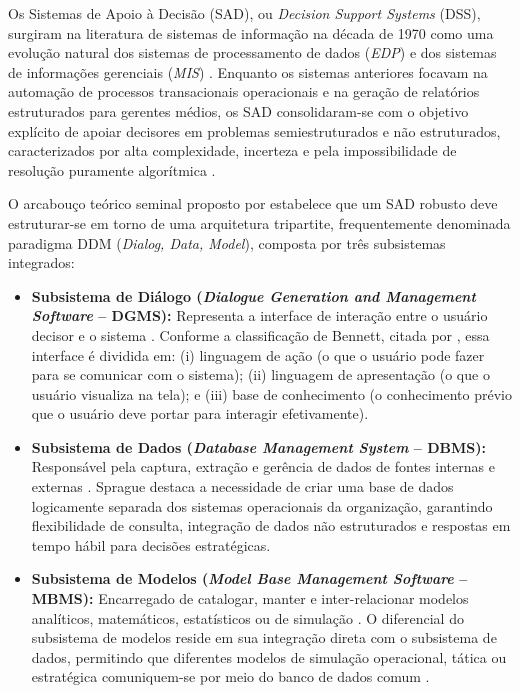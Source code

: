 Os Sistemas de Apoio à Decisão (SAD), ou \textit{Decision Support Systems} (DSS), surgiram na literatura de sistemas de informação na década de 1970 como uma evolução natural dos sistemas de processamento de dados (\textit{EDP}) e dos sistemas de informações gerenciais (\textit{MIS}) \cite{sprague1980framework}. Enquanto os sistemas anteriores focavam na automação de processos transacionais operacionais e na geração de relatórios estruturados para gerentes médios, os SAD consolidaram-se com o objetivo explícito de apoiar decisores em problemas semiestruturados e não estruturados, caracterizados por alta complexidade, incerteza e pela impossibilidade de resolução puramente algorítmica \cite{sprague1980framework}.

O arcabouço teórico seminal proposto por  estabelece que um SAD robusto deve estruturar-se em torno de uma arquitetura tripartite, frequentemente denominada paradigma DDM (\textit{Dialog, Data, Model}), composta por três subsistemas integrados:

\begin{itemize}
    \item \textbf{Subsistema de Diálogo (\textit{Dialogue Generation and Management Software} -- DGMS):} Representa a interface de interação entre o usuário decisor e o sistema \cite{sprague1980framework}. Conforme a classificação de Bennett, citada por , essa interface é dividida em: (i) linguagem de ação (o que o usuário pode fazer para se comunicar com o sistema); (ii) linguagem de apresentação (o que o usuário visualiza na tela); e (iii) base de conhecimento (o conhecimento prévio que o usuário deve portar para interagir efetivamente).
    \item \textbf{Subsistema de Dados (\textit{Database Management System} -- DBMS):} Responsável pela captura, extração e gerência de dados de fontes internas e externas \cite{sprague1980framework}. Sprague \cite{sprague1980framework} destaca a necessidade de criar uma base de dados logicamente separada dos sistemas operacionais da organização, garantindo flexibilidade de consulta, integração de dados não estruturados e respostas em tempo hábil para decisões estratégicas.
    \item \textbf{Subsistema de Modelos (\textit{Model Base Management Software} -- MBMS):} Encarregado de catalogar, manter e inter-relacionar modelos analíticos, matemáticos, estatísticos ou de simulação \cite{sprague1980framework}. O diferencial do subsistema de modelos reside em sua integração direta com o subsistema de dados, permitindo que diferentes modelos de simulação operacional, tática ou estratégica comuniquem-se por meio do banco de dados comum \cite{sprague1980framework}.
\end{itemize}

